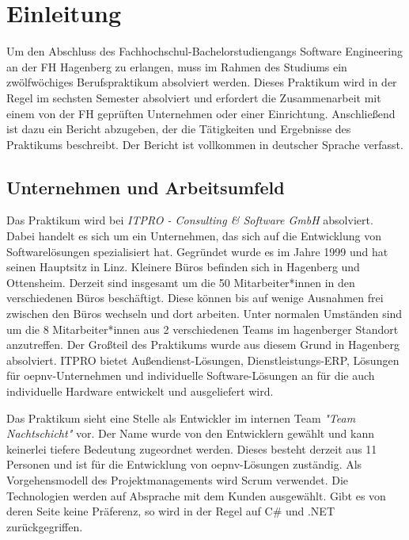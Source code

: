 \chapter{Einleitung}
\label{chap:einleitung}
    Um den Abschluss des Fachhochschul-Bachelorstudiengangs Software Engineering an
    der FH Hagenberg zu erlangen, muss im Rahmen des Studiums ein zwölfwöchiges Berufspraktikum absolviert werden. Dieses Praktikum wird in der Regel im sechsten
     Semester absolviert und erfordert die Zusammenarbeit mit einem von der FH geprüften
    Unternehmen oder einer Einrichtung. Anschließend ist dazu ein Bericht abzugeben, der
    die Tätigkeiten und Ergebnisse des Praktikums beschreibt. Der
    Bericht ist vollkommen in deutscher Sprache verfasst.

\section{Unternehmen und Arbeitsumfeld}\label{sec:unternehmen-und-arbeitsumfeld}
    Das Praktikum wird bei \emph{ITPRO - Consulting \& Software GmbH} \cite{ITPRO} absolviert. Dabei handelt es sich um ein Unternehmen, das sich auf die Entwicklung von Softwarelösungen 
    spezialisiert hat. Gegründet wurde es im Jahre 1999 und hat seinen Hauptsitz in Linz. Kleinere Büros befinden sich in Hagenberg und Ottensheim. Derzeit sind insgesamt um die 
    50 Mitarbeiter*innen in den verschiedenen Büros beschäftigt. Diese können bis auf wenige Ausnahmen frei zwischen den Büros wechseln und dort arbeiten. Unter normalen Umständen sind 
    um die 8 Mitarbeiter*innen  aus 2 verschiedenen Teams im hagenberger Standort anzutreffen.
    Der Großteil des Praktikums wurde aus diesem Grund in Hagenberg absolviert.
    ITPRO bietet Außendienst-Lösungen, Dienstleistungs-ERP, Lösungen für \gls{oepnv}-Unternehmen und individuelle Software-Lösungen an für die auch individuelle Hardware entwickelt
    und ausgeliefert wird.

    Das Praktikum sieht eine Stelle als Entwickler im internen Team \emph{"Team Nachtschicht"} vor. Der Name wurde von den Entwicklern gewählt und kann keinerlei tiefere Bedeutung zugeordnet werden.
    Dieses besteht derzeit aus 11 Personen und ist für die Entwicklung 
    von \gls{oepnv}-Lösungen zuständig. Als Vorgehensmodell des Projektmanagements wird Scrum verwendet. Die Technologien werden auf Absprache mit dem Kunden ausgewählt. Gibt es von deren Seite keine
    Präferenz, so wird in der Regel auf C\# und .NET zurückgegriffen.

